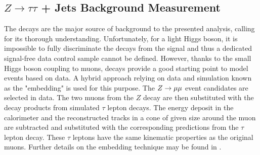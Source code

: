 \subsection{$Z \rightarrow \tau\tau$ + Jets Background Measurement}\label{sec:ztau}
The  \Ztautau decays are the major source of  background to the presented  analysis,  calling for its thorough understanding.
Unfortunately, for a light Higgs boson, it is impossible to fully discriminate the  \Ztautau decays 
from the signal and thus a 
dedicated signal-free data control sample cannot be defined.
However, thanks to the small Higgs boson coupling to muons, \Zmumu decays provide a good starting point to 
model \Ztautau events based on data. A hybrid approach relying on data and simulation known as the "embedding" is used for this purpose.
The $Z\rightarrow \mu\mu$ event candidates are selected in data. The two muons from the $Z$ decay are then substituted with the decay 
products from simulated $\tau$ lepton decays. The energy deposit in the calorimeter and the reconstructed tracks 
in a cone of given size around the muon are subtracted
and substituted with the corresponding predictions from the $\tau$ lepton decay. These $\tau$ leptons  have the same kinematic properties
 as the original muons. Further details on the embedding technique may be found in \cite{Embedding, SMold}.



